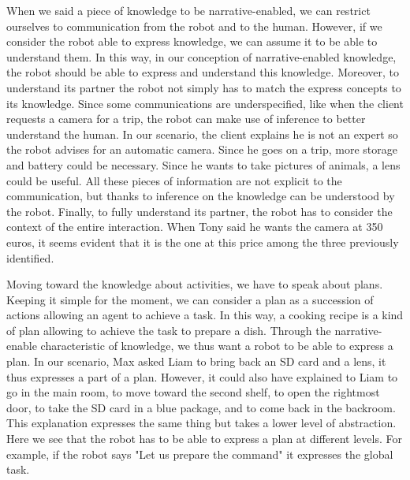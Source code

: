 When we said a piece of knowledge to be narrative-enabled, we can restrict ourselves to communication from the robot and to the human. However, if we consider the robot able to express knowledge, we can assume it to be able to understand them. In this way, in our conception of narrative-enabled knowledge, the robot should be able to express and understand this knowledge. Moreover, to understand its partner the robot not simply has to match the express concepts to its knowledge. Since some communications are underspecified, like when the client requests a camera for a trip, the robot can make use of inference to better understand the human. In our scenario, the client explains he is not an expert so the robot advises for an automatic camera. Since he goes on a trip, more storage and battery could be necessary. Since he wants to take pictures of animals, a lens could be useful. All these pieces of information are not explicit to the communication, but thanks to inference on the knowledge can be understood by the robot. Finally, to fully understand its partner, the robot has to consider the context of the entire interaction. When Tony said he wants the camera at 350 euros, it seems evident that it is the one at this price among the three previously identified.

Moving toward the knowledge about activities, we have to speak about plans. Keeping it simple for the moment, we can consider a plan as a succession of actions allowing an agent to achieve a task. In this way, a cooking recipe is a kind of plan allowing to achieve the task to prepare a dish. Through the narrative-enable characteristic of knowledge, we thus want a robot to be able to express a plan. In our scenario, Max asked Liam to bring back an SD card and a lens, it thus expresses a part of a plan. However, it could also have explained to Liam to go in the main room, to move toward the second shelf, to open the rightmost door, to take the SD card in a blue package, and to come back in the backroom. This explanation expresses the same thing but takes a lower level of abstraction. Here we see that the robot has to be able to express a plan at different levels. For example, if the robot says "Let us prepare the command" it expresses the global task.

